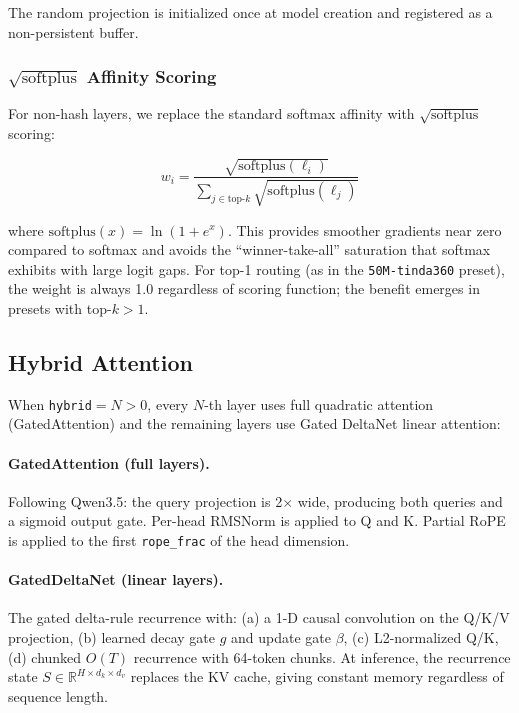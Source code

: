 \documentclass[11pt,a4paper]{article}
\begin{document}
The random projection is initialized once at model creation and registered as a
non-persistent buffer.

\subsubsection{$\sqrt{\mathrm{softplus}}$ Affinity Scoring}
\label{sec:affinity}

For non-hash layers, we replace the standard softmax affinity with
$\sqrt{\mathrm{softplus}}$ scoring:

\begin{equation}
  w_i = \frac{\sqrt{\mathrm{softplus}(\ell_i)}}
             {\sum_{j \in \text{top-}k} \sqrt{\mathrm{softplus}(\ell_j)}}
\end{equation}

where $\mathrm{softplus}(x) = \ln(1 + e^x)$. This provides smoother gradients
near zero compared to softmax and avoids the ``winner-take-all'' saturation
that softmax exhibits with large logit gaps. For top-1 routing (as in the
\texttt{50M-tinda360} preset), the weight is always 1.0 regardless of scoring
function; the benefit emerges in presets with top-$k > 1$.

\subsection{Hybrid Attention}
\label{sec:hybrid}

When \texttt{hybrid}$= N > 0$, every $N$-th layer uses full quadratic attention
(GatedAttention) and the remaining layers use Gated DeltaNet linear attention:

\paragraph{GatedAttention (full layers).}
Following Qwen3.5: the query projection is 2$\times$ wide, producing both
queries and a sigmoid output gate. Per-head RMSNorm is applied to Q and K.
Partial RoPE is applied to the first \texttt{rope\_frac} of the head dimension.

\paragraph{GatedDeltaNet (linear layers).}
The gated delta-rule recurrence \citep{yang2024gated} with:
(a) a 1-D causal convolution on the Q/K/V projection,
(b) learned decay gate $g$ and update gate $\beta$,
(c) L2-normalized Q/K,
(d) chunked $O(T)$ recurrence with 64-token chunks.
At inference, the recurrence state $S \in \mathbb{R}^{H \times d_k \times d_v}$
replaces the KV cache, giving constant memory regardless of sequence length.
\end{document}
